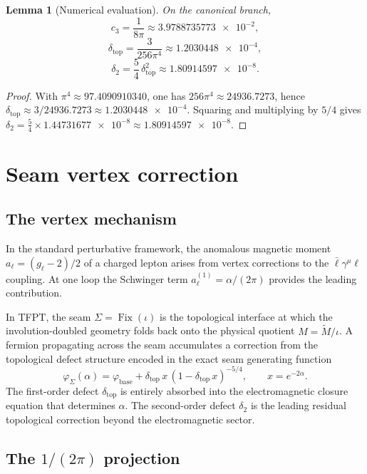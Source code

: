 \documentclass[11pt,a4paper]{article}
\newtheorem{lemma}[theorem]{Lemma}
\theoremstyle{definition}
\theoremstyle{remark}
\DeclareMathOperator{\Fix}{Fix}
\newcommand{\Seam}{\Sigma}
\newcommand{\inv}{\iota}
\newcommand{\cthree}{c_3}
\newcommand{\phibase}{\varphi_{\mathrm{base}}}
\newcommand{\phiseam}{\varphi_{\Sigma}}
\newcommand{\deltatop}{\delta_{\mathrm{top}}}
\numberwithin{equation}{section}
\begin{document}
\begin{lemma}[Numerical evaluation]\label{lem:numerics}
On the canonical branch,
\[
\cthree=\frac{1}{8\pi}\approx\num{3.9788735773e-2},
\]
\[
\deltatop=\frac{3}{256\pi^4}\approx\num{1.2030448e-4},
\]
\begin{equation}\label{eq:delta2-numerical}
\delta_2=\frac54\,\deltatop^2\approx\num{1.80914597e-8}.
\end{equation}
\end{lemma}

\begin{proof}
With $\pi^4\approx\num{97.4090910340}$, one has
$256\pi^4\approx\num{24936.7273}$, hence
$\deltatop\approx3/\num{24936.7273}\approx\num{1.2030448e-4}$.
Squaring and multiplying by $5/4$ gives
$\delta_2=\frac54\times\num{1.44731677e-8}\approx\num{1.80914597e-8}$.
\end{proof}


\section{Seam vertex correction}\label{sec:vertex}

\subsection{The vertex mechanism}\label{sec:vertex-mechanism}

In the standard perturbative framework, the anomalous magnetic moment
$a_\ell=(g_\ell-2)/2$ of a charged lepton arises from vertex corrections
to the $\bar\ell\gamma^\mu\ell$ coupling. At one loop the Schwinger term
$a_\ell^{(1)}=\alpha/(2\pi)$ provides the leading contribution.

In TFPT, the seam $\Seam=\Fix(\inv)$ is the topological interface at which
the involution-doubled geometry folds back onto the physical quotient
$M=\widetilde M/\inv$. A fermion propagating across the seam accumulates a
correction from the topological defect structure encoded in the exact seam
generating function
\[
\phiseam(\alpha)
=
\phibase+\deltatop\,x\,(1-\deltatop\,x)^{-5/4},
\qquad
x=e^{-2\alpha}.
\]
The first-order defect $\deltatop$ is entirely absorbed into the
electromagnetic closure equation that determines $\alpha$. The second-order
defect $\delta_2$ is the leading residual topological correction beyond the
electromagnetic sector.

\subsection{The \texorpdfstring{$1/(2\pi)$}{1/(2pi)} projection}
\end{document}
